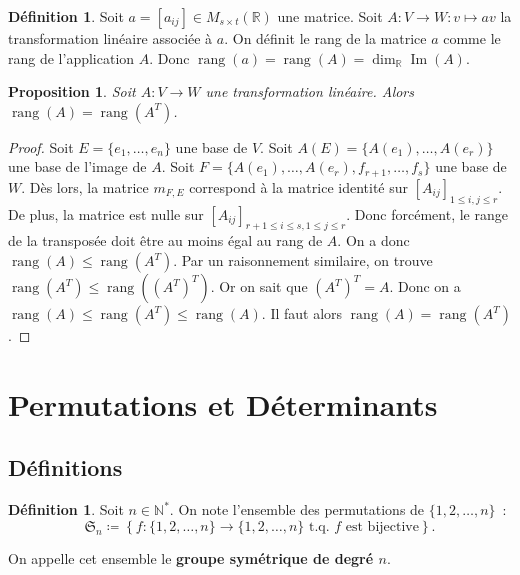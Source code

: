 \documentclass{article}
\DeclareMathOperator{\Imf}{Im}
\DeclareMathOperator{\rang}{rang}
\newcommand{\R}{\mathbb R}
\newcommand{\M}[3]{M_{#1 \times #2}(#3)}
\newcommand{\tq}{\textrm{ t.q. }}
\newtheorem{prp}[thm]{Proposition}
\theoremstyle{definition}
\newtheorem{déf}[thm]{Définition}
\theoremstyle{remark}
\begin{document}
		\begin{déf} Soit $a = [a_{ij}] \in \M st\R$ une matrice. Soit $A : V \to W : v \mapsto av$ la transformation linéaire associée à $a$. On définit le rang de
		la matrice $a$ comme le rang de l'application $A$. Donc $\rang(a) = \rang(A) = \dim_\R\Imf(A)$. \end{déf}

		\begin{prp} Soit $A : V \to W$ une transformation linéaire. Alors $\rang(A) = \rang(A^T)$. \end{prp}

		\begin{proof} Soit $E = \{e_1, \dotsc, e_n\}$ une base de $V$. Soit $A(E) = \{A(e_1), \dotsc, A(e_r)\}$ une base de l'image de $A$. Soit
		$F = \{A(e_1), \dotsc, A(e_r), f_{r+1}, \dotsc, f_s\}$ une base de $W$. Dès lors, la matrice $m_{F, E}$ correspond à la matrice identité sur
		$[A_{ij}]_{1 \leq i, j \leq r}$. De plus, la matrice est nulle sur $[A_{ij}]_{r+1 \leq i \leq s, 1 \leq j \leq r}$. Donc forcément, le range de la transposée
		doit être au moins égal au rang de $A$. On a donc $\rang(A) \leq \rang(A^T)$. Par un raisonnement similaire, on trouve
		$\rang(A^T) \leq \rang\left(\left(A^T\right)^T\right)$. Or on sait que $\left(A^T\right)^T = A$. Donc on a $\rang(A) \leq \rang(A^T) \leq \rang(A)$. Il faut
		alors $\rang(A) = \rang(A^T)$. \end{proof}

\newpage
\section{Permutations et Déterminants}
	\subsection{Définitions}
		\begin{déf} Soit $n \in \mathbb N^*$. On note l'ensemble des permutations de $\{1, 2, \dotsc, n\}$~:
		\[\mathfrak{S}_n \coloneqq \left\{f : \{1, 2, \dotsc, n\} \to \{1, 2, \dotsc, n\} \tq f \text{ est bijective}\right\}.\]

		On appelle cet ensemble le \textbf{groupe symétrique de degré $n$}. \end{déf}
\end{document}
